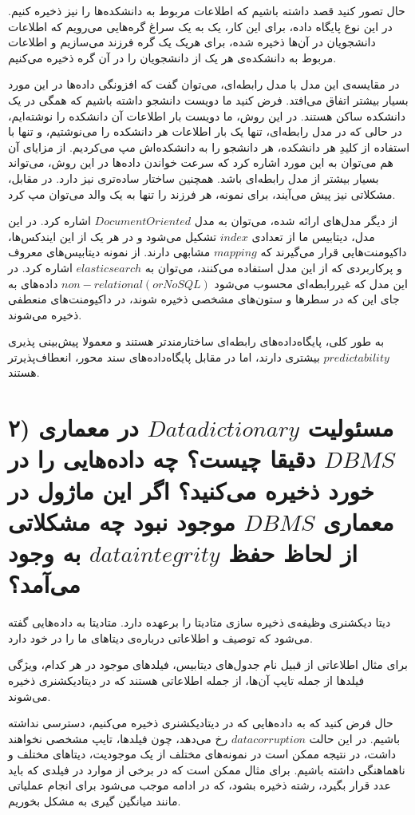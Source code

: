 حال تصور کنید قصد داشته باشیم که اطلاعات مربوط به دانشکده‌ها را نیز ذخیره کنیم.
در این نوع پایگاه داده، برای این کار، یک به یک سراغ گره‌هایی می‌رویم که اطلاعات دانشجویان در آن‌ها ذخیره شده، برای هریک یک گره فرزند می‌سازیم و اطلاعات مربوط به دانشکده‌ی هر یک از دانشجویان را در آن گره ذخیره می‌کنیم.

در مقایسه‌ی این مدل با مدل رابطه‌ای، می‌توان گفت که افزونگی داده‌ها در این مورد بسیار بیشتر اتفاق می‌افتد.
 فرض کنید ما دویست دانشجو داشته باشیم که همگی در یک دانشکده ساکن هستند. در این روش، ما دویست بار اطلاعات آن دانشکده را نوشته‌ایم، در حالی که در مدل رابطه‌ای، تنها یک بار اطلاعات هر دانشکده را می‌نوشتیم، 
 و تنها با استفاده از کلیدِ هر دانشکده، هر دانشجو را به دانشکده‌اش مپ می‌کردیم.
از مزایای آن هم می‌توان به این مورد اشاره کرد که سرعت خواندن داده‌ها در این روش، می‌تواند بسیار بیشتر از مدل رابطه‌ای باشد. همچنین ساختار ساده‌تری نیز دارد.
در مقابل، مشکلاتی نیز پیش می‌آیند، برای نمونه، هر فرزند را تنها به یک والد می‌توان مپ کرد.


از دیگر مدل‌های ارائه شده، می‌توان به مدل 
$Document Oriented$
اشاره کرد.
در این مدل، دیتابیس ما از تعدادی 
$index$
تشکیل می‌شود و در هر یک از این ایندکس‌ها، داکیومنت‌هایی قرار می‌گیرند که 
$mapping$
مشابهی دارند. از نمونه دیتابیس‌های معروف و پرکاربردی که از این مدل استفاده می‌کنند، می‌توان به 
$elasticsearch$
اشاره کرد.
در این مدل که غیررابطه‌ای محسوب می‌شود 
$non-relational (or NoSQL)$
 داده‌های به جای این که در سطرها و ستون‌های مشخصی ذخیره شوند، در داکیومنت‌های منعطفی ذخیره می‌شوند.
 
به طور کلی، پایگاه‌داده‌های رابطه‌ای ساختارمند‌تر هستند و معمولا پیش‌بینی پذیری
$predictability$
بیشتری دارند، اما در مقابل پایگاه‌داده‌های سند محور، انعطاف‌پذیرتر هستند.



\section*{\centering ۲) مسئولیت
$Data dictionary$
در معماری 
$DBMS$
دقیقا چیست؟ چه داده‌هایی را در خورد ذخیره می‌کنید؟ اگر این ماژول در معماری 
$DBMS$
موجود نبود چه مشکلاتی از لحاظ حفظ 
$data integrity$
به وجود می‌آمد؟
}


دیتا دیکشنری وظیفه‌ی ذخیره سازی متادیتا را برعهده دارد. متادیتا به داده‌هایی گفته می‌شود که توصیف و اطلاعاتی درباره‌ی دیتاهای ما را در خود دارد.

برای مثال اطلاعاتی از قبیل نام جدول‌های دیتابیس، فیلدهای موجود در هر کدام، ویژگی فیلدها از جمله تایپ آن‌ها، از جمله اطلاعاتی هستند که در دیتادیکشنری ذخیره می‌شوند.

حال فرض کنید که به داده‌هایی که در دیتادیکشنری ذخیره می‌کنیم، دسترسی نداشته باشیم. در این حالت 
$data corruption$
رخ می‌دهد، چون فیلدها، تایپ مشخصی نخواهند داشت، در نتیجه ممکن است در نمونه‌های مختلف از یک موجودیت، دیتاهای مختلف و ناهماهنگی داشته باشیم. 
برای مثال ممکن است که در برخی از موارد در فیلدی که باید عدد قرار بگیرد، رشته ذخیره بشود، که در ادامه موجب می‌شود برای انجام عملیاتی مانند میانگین گیری به مشکل بخوریم.